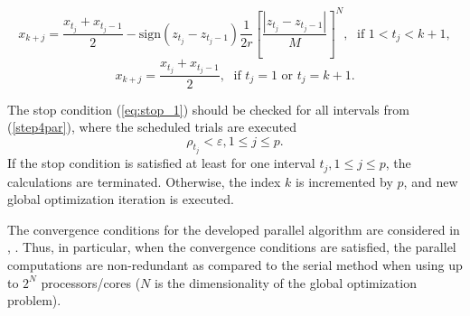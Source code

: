 \documentclass{aims}
\theoremstyle{definition}
\begin{document}
\begin{equation} \label{step5par}
x_{k+j}=\frac{x_{t_j}+x_{t_j-1}}{2}-\mathrm{sign}(z_{t_j}-z_{t_j-1})\frac{1}{2r}\left[\frac{|z_{t_j}-z_{t_j-1}|}{M}\right]^N,\; \textrm{ if } 1<t_j<k+1,
\end{equation}
\[
x_{k+j}=\frac{x_{t_j}+x_{t_j-1}}{2},\; \textrm{ if } t_j=1 \textrm{ or } t_j=k+1.
\]
\par
The stop condition (\ref{eq:stop_1}) should be checked for all intervals from (\ref{step4par}),
where the scheduled trials are executed
\begin{equation}
  \label{eq:stop}
\rho_{t_j}<\varepsilon,1\leq j\leq p.
\end{equation}
If the stop condition is satisfied at least for one interval \(t_j, 1\le j\le p\), the calculations
are terminated. Otherwise, the index \(k\) is incremented by \(p\), and new global optimization iteration is executed.
\par
The convergence conditions for the developed parallel algorithm are considered
in \cite{stronginGergelBarkalovParGO}, \cite{strSergGO}. Thus, in particular, when the convergence conditions are
satisfied, the parallel computations are non-redundant as compared to the serial method
when using up to \(2^N\) processors/cores (\(N\) is the dimensionality of the global optimization problem).
\end{document}
